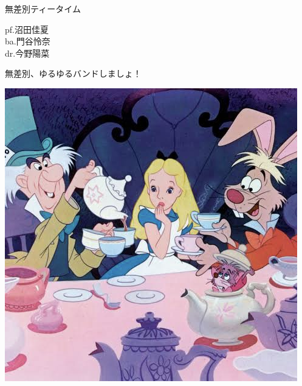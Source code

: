 \documentclass[a4paper]{article}
\begin{document}
\begin{minipage}{\textwidth - 0.25\textheight}
    \flushleft
    \Huge \vspace{1em}無差別ティータイム\vspace{1em}\normalsize \\
    \begin{minipage}{15em}
        \flushleft
        \Large
        pf.沼田佳夏\\ba.門谷怜奈\\dr.今野陽菜
    \end{minipage}
    \begin{minipage}{\textwidth - 18em}
        \flushleft
        \large
        無差別、ゆるゆるバンドしましょ！
    \end{minipage}
\end{minipage}
\begin{minipage}{0.25\textheight}
    \flushleft
    \includegraphics[width=0.25\textheight]{./FULLHOUSE/resources/13.jpeg}
\end{minipage}
\end{document}
